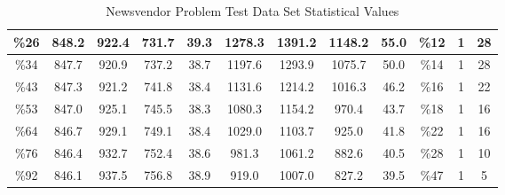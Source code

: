 \documentclass[12pt]{article}
\begin{document}
\begin{table}
{\begin{tabular}{|c|c|c|c|c|c|c|c|c|c|c|c|}
\%26                                                                                               & 848.2         & 922.4        & 731.7        & 39.3            & 1278.3        & 1391.2       & 1148.2       & 55.0            & \%12                                    & 1 &28                                                                                                    \\ \hline
\%34                                                                                               & 847.7         & 920.9        & 737.2        & 38.7            & 1197.6        & 1293.9       & 1075.7       & 50.0            & \%14                                    & 1    &28                                                                                            \\ \hline
\%43                                                                                               & 847.3         & 921.2        & 741.8        & 38.4            & 1131.6        & 1214.2       & 1016.3       & 46.2            & \%16                                    & 1 &22                                                                                                \\ \hline
\%53                                                                                               & 847.0         & 925.1        & 745.5        & 38.3            & 1080.3        & 1154.2       & 970.4        & 43.7            & \%18                                    & 1    &16                                                                                           \\ \hline
\%64                                                                                               & 846.7         & 929.1        & 749.1        & 38.4            & 1029.0        & 1103.7       & 925.0        & 41.8            & \%22                                    & 1    &16                                                                                               \\ \hline
\%76                                                                                               & 846.4         & 932.7        & 752.4        & 38.6            & 981.3         & 1061.2       & 882.6        & 40.5            & \%28                                    & 1       &10                                                                                              \\ \hline
\%92                                                                                               & 846.1         & 937.5        & 756.8        & 38.9            & 919.0         & 1007.0       & 827.2        & 39.5            & \%47                                    & 1          &5                                                                                        \\ \hline
\end{tabular}}
\caption{Newsvendor Problem Test Data Set Statistical Values} 
\label{tab:table2}
\end{table} 
\end{document}

